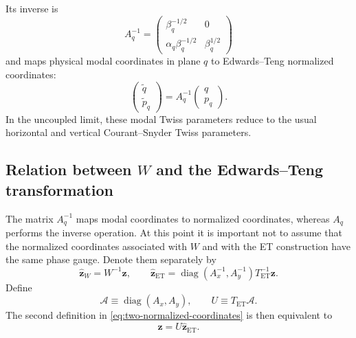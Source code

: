\documentclass[11pt,a4paper]{article}
\newcommand{\diag}{\operatorname{diag}}
\newcommand{\mat}[1]{\bm{#1}}
\begin{document}
Its inverse is
\begin{equation}
 A_q^{-1}=
 \begin{pmatrix}
  \beta_q^{-1/2}&0\\
  \alpha_q\beta_q^{-1/2}&\beta_q^{1/2}
 \end{pmatrix}
 \label{eq:Aq-inverse}
\end{equation}
and maps physical modal coordinates in plane $q$ to Edwards--Teng normalized
coordinates:
\begin{equation}
 \begin{pmatrix}\widetilde q\\\widetilde p_q\end{pmatrix}
 =A_q^{-1}\begin{pmatrix}q\\p_q\end{pmatrix}.
 \label{eq:cs-normalization}
\end{equation}
In the uncoupled limit, these modal Twiss parameters reduce to the usual
horizontal and vertical Courant--Snyder Twiss parameters.

\subsection{Relation between $W$ and the Edwards--Teng transformation}

The matrix $A_q^{-1}$ maps modal coordinates to normalized coordinates,
whereas $A_q$ performs the inverse operation.  At this point it is important
not to assume that the normalized coordinates associated with $W$ and with
the ET construction have the same phase gauge.  Denote them separately by
\begin{equation}
 \widehat{\mat z}_W=W^{-1}\mat z,
 \qquad
 \widehat{\mat z}_{\mathrm{ET}}
 =\diag(A_x^{-1},A_y^{-1})T_{\mathrm{ET}}^{-1}\mat z.
 \label{eq:two-normalized-coordinates}
\end{equation}
Define
\begin{equation}
 \mathcal A\equiv\diag(A_x,A_y),
 \qquad
 U\equiv T_{\mathrm{ET}}\mathcal A.
 \label{eq:U-definition}
\end{equation}
The second definition in \cref{eq:two-normalized-coordinates} is then
equivalent to
\begin{equation}
 \mat z=U\widehat{\mat z}_{\mathrm{ET}}.
 \label{eq:z-from-et-normalized}
\end{equation}
\end{document}
